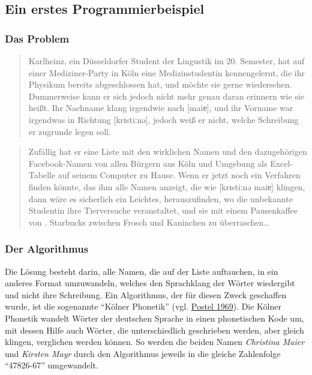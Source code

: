 \subsection{\texorpdfstring{{Ein erstes
Programmierbeispiel}}{Ein erstes Programmierbeispiel}}

\subsubsection{\texorpdfstring{{Das Problem}}{Das Problem}}

\begin{quote}
Karlheinz, ein Düsseldorfer Student der Lingustik im 20. Semester, hat
auf einer Mediziner-Party in Köln eine Medizinstudentin kennengelernt,
die ihr Physikum bereits abgeschlossen hat, und möchte sie gerne
wiedersehen. Dummerweise kann er sich jedoch nicht mehr genau daran
erinnern wie sie heißt. Ihr Nachname klang irgendwie nach {{[}maiɐ{]}},
und ihr Vorname war irgendwas in Richtung {{[}krɪstiːnə{]}}, jedoch weiß
er nicht, welche Schreibung er zugrunde legen soll.
\end{quote}



\begin{quote}
Zufällig hat er eine Liste mit den wirklichen Namen und den
dazugehörigen Facebook-Namen von allen Bürgern aus Köln und Umgebung als
Excel-Tabelle auf seinem Computer zu Hause. Wenn er jetzt noch ein
Verfahren finden könnte, das ihm alle Namen anzeigt, die wie
{{[}krɪstiːnə maiɐ{]}} klingen, dann wäre es sicherlich ein Leichtes,
herauszufinden, wo die unbekannte Studentin ihre Tierversuche
veranstaltet, und sie mit einem Pausenkaffee von . Starbucks zwischen
Frosch und Kaninchen zu überraschen\ldots{}
\end{quote}


\subsubsection{\texorpdfstring{{Der Algorithmus}}{Der Algorithmus}}

{ Die Lösung besteht darin, alle Namen, die auf der Liste auftauchen, in
ein anderes Format umzuwandeln, welches den Sprachklang der Wörter
wiedergibt und nicht ihre Schreibung. Ein Algorithmus, der für diesen
Zweck geschaffen wurde, ist die sogenannte ``Kölner Phonetik'' (vgl.
\href{http://bibliography.lingpy.org?key=Postel1969}{Postel 1969}). Die
Kölner Phonetik wandelt Wörter der deutschen Sprache in einen
phonetischen Kode um, mit dessen Hilfe auch Wörter, die unterschiedlich
geschrieben werden, aber gleich klingen, verglichen werden können. So
werden die beiden Namen \emph{Christina Maier} und \emph{Kirsten Mayr}
durch den Algorithmus jeweils in die gleiche Zahlenfolge ``47826-67''
umgewandelt.}



